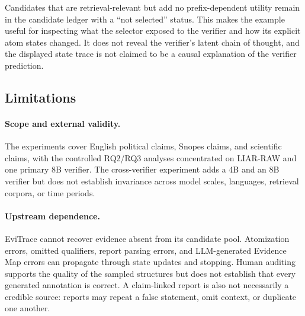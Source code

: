Candidates that are retrieval-relevant but add no prefix-dependent utility
remain in the candidate ledger with a ``not selected'' status.  This makes
the example useful for inspecting what the selector exposed to the
verifier and how its explicit atom states changed.  It does not reveal the
verifier's latent chain of thought, and the displayed state trace is not
claimed to be a causal explanation of the verifier prediction.




\subsection{Limitations}
\label{sec:supp-limitations}

\paragraph{Scope and external validity.}
The experiments cover English political claims, Snopes claims, and
scientific claims, with the controlled RQ2/RQ3 analyses concentrated on
LIAR-RAW and one primary 8B verifier.  The cross-verifier experiment adds
a 4B and an 8B verifier but does not establish invariance across model scales,
languages, retrieval corpora, or time periods.

\paragraph{Upstream dependence.}
EviTrace cannot recover evidence absent from its candidate pool.
Atomization errors, omitted qualifiers, report parsing errors, and
LLM-generated Evidence Map errors can propagate through state updates and
stopping.  Human auditing supports the quality of the sampled structures
but does not establish that every generated annotation is correct.  A
claim-linked report is also not necessarily a credible source: reports may
repeat a false statement, omit context, or duplicate one another.

